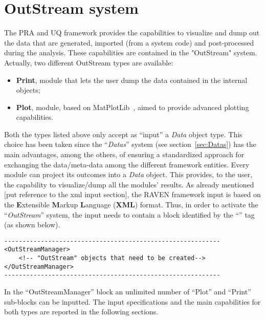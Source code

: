 \section{OutStream system \\ \vspace{2 mm} }
\label{sec:outstream}
The PRA and UQ framework provides the capabilities to visualize and dump out the
data that are generated, imported (from a system code) and post-processed during
the analysis.
%
These capabilities are contained in the "OutStream" system.
%
Actually, two different OutStream types are available:
\vspace{-5mm}
\begin{itemize}
  \itemsep0em
  \item \textbf{Print}, module that lets the user dump the data contained in the
  internal objects;
  \item \textbf{Plot}, module, based on MatPlotLib~\cite{MatPlotLib}, aimed to
  provide advanced plotting capabilities.
\end{itemize}
\vspace{-5mm}
Both the types listed above only accept as ``input'' a \textit{Data} object
type.
%
This choice has been taken since the ``\textit{Datas}'' system (see
section~\ref{sec:Datas}) has the main advantages, among the others, of ensuring
a standardized approach for exchanging the data/meta-data among the different
framework entities.
%
Every module can project its outcomes into a \textit{Data} object.
%
This provides, to the user, the capability to visualize/dump all the modules'
results.
%
As already mentioned [put reference to the xml input section], the RAVEN
framework input is based on the \textbf{E}xtensible \textbf{M}arkup
\textbf{L}anguage (\textbf{XML}) format.
%
Thus, in order to activate the ``\textit{OutStream}'' system, the input needs to
contain a block identified by the ``\textbf{}'' tag (as
shown below).

\begin{lstlisting}[style=XML]
-----------------------------------------------------------
<OutStreamManager>
    <!-- "OutStream" objects that need to be created-->
</OutStreamManager>
-----------------------------------------------------------
\end{lstlisting}
In the ``OutStreamManager'' block an unlimited number of ``Plot'' and ``Print''
sub-blocks can be inputted.
%
The input specifications and the main capabilities for both types are reported
in the following sections.
%
%
